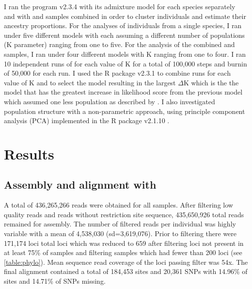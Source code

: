 I ran the program \structure v2.3.4 \parencite{pritchard2000} with its admixture 
model for each species separately and with \fowl and \wood samples combined 
in order to cluster individuals and estimate their ancestry proportions. 
For the \structure analyses of individuals from a single species, I ran \structure
under five different models with each assuming a different number of populations
(K parameter) ranging from one to five. 
For the \structure analysis of the combined \fowl and \wood samples, I ran 
\structure under four different models with K ranging from one to four.
I ran 10 independent runs of \structure for each value of K for a total of 100,000
steps and burnin of 50,000 for each run.
I used the R package \pophelper v2.3.1 \parencite{francis2017} to combine
runs for each value of K and to select the model resulting in the largest
$\Delta$K which is the the model that has the greatest increase in likelihood 
score from the previous model which assumed one less population as described by \parencite{evanno2005}.
I also investigated population structure with a non-parametric approach, using
principle component analysis (PCA) implemented in the R package \adegenet
\adegenet v2.1.10 \parencite{jombart2008}. 

\section{Results}

\subsection{Assembly and alignment with \pyrad}
A total of 436,265,266 reads were obtained for all samples. After filtering low
quality reads and reads without restriction site sequence, 435,650,926 total reads 
remained for assembly.
The number of filtered reads per individual was highly variable with a mean of 
4,538,030 (sd=3,619,076).
Prior to filtering there were 171,174 loci total loci which was reduced to  
659 after filtering loci not present in at least 75\% of samples and filtering
samples which had fewer than 200 loci (see \cref{table:phylo}).
Mean sequence read coverage of the loci passing filter was 54x.
The final alignment contained a total of 184,453 sites and 20,361 SNPs with 
14.96\% of sites and 14.71\% of SNPs missing.

